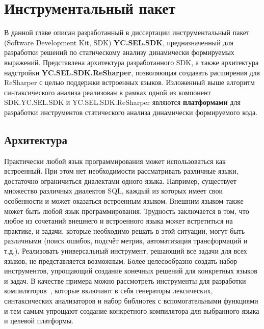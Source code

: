 \chapter{Инструментальный пакет} \label{relWorks}

В данной главе описан разработанный в диссертации инструментальный пакет (Software Development Kit, SDK) \textbf{YC.SEL.SDK}, предназначенный для разработки решений по статическому анализу динамически формируемых выражений. Представлена архитектура разработанного SDK, а также архитектура надстройки \textbf{YC.SEL.SDK.ReSharper}, позволяющая создавать расширения для ReSharper с целью поддержки встроенных языков. Изложенный выше алгоритм синтаксического анализа реализован в рамках одной из компонент SDK.YC.SEL.SDK и YC.SEL.SDK.ReSharper являются \textbf{платформами} для разработки инструментов статического анализа динамически формируемого кода.

\section{Архитектура}

Практически любой язык программирования может использоваться как встроенный. При этом нет необходимости рассматривать различные языки, достаточно ограничиться диалектами одного языка. Например, существует множество различных диалектов SQL, каждый из которых имеет свои особенности и может оказаться встроенным языком. Внешним языком также может быть любой язык программирования. Трудность заключается в том, что любое из сочетаний внешнего и встроенного языка может встретиться на практике, и задачи, которые необходимо решать в этой ситуации, могут быть различными (поиск ошибок, подсчёт метрик, автоматизация трансформаций и т.д.). Реализовать универсальный инструмент, решающий все задачи для всех языков, не представляется возможным. Более целесообразно создать набор инструментов, упрощающий создание конечных решений для конкретных языков и задач. В качестве примера можно рассмотреть инструменты для разработки компиляторов~\cite{yaccBook, CompilerCompiler}, которые включают в себя генераторы лексических, синтаксических анализаторов и набор библиотек с вспомогательными функциями и тем самым упрощают создание конкретного компилятора для выбранного языка и целевой платформы.


